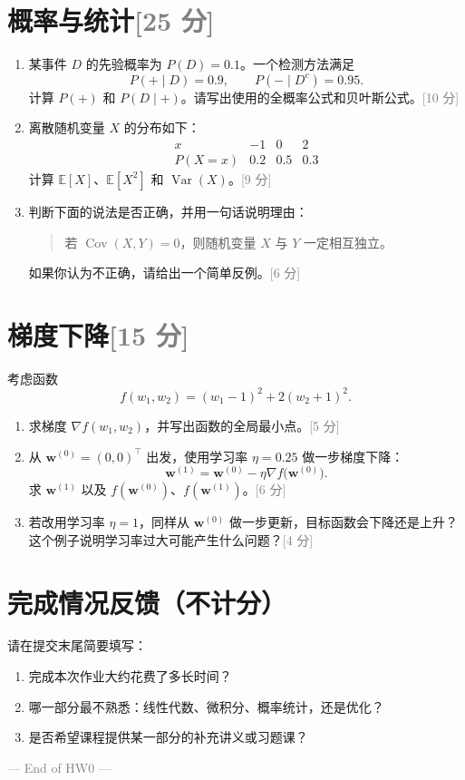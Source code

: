 \documentclass[11pt,a4paper]{article}
\newcommand{\E}{\mathbb{E}}
\newcommand{\Var}{\operatorname{Var}}
\newcommand{\Cov}{\operatorname{Cov}}
\newcommand{\grad}{\nabla}
\newcommand{\points}[1]{\hfill\textcolor{gray}{[#1 分]}}
\begin{document}
\section{概率与统计\texorpdfstring{\points{25}}{（25 分）}}

\begin{enumerate}
    \item 某事件 $D$ 的先验概率为 $P(D)=0.1$。一个检测方法满足
    \[
        P(+\mid D)=0.9,
        \qquad
        P(-\mid D^c)=0.95.
    \]
    计算 $P(+)$ 和 $P(D\mid +)$。请写出使用的全概率公式和贝叶斯公式。\points{10}

    \item 离散随机变量 $X$ 的分布如下：
    \[
    \begin{array}{c|ccc}
        x & -1 & 0 & 2\\ \hline
        P(X=x) & 0.2 & 0.5 & 0.3
    \end{array}
    \]
    计算 $\E[X]$、$\E[X^2]$ 和 $\Var(X)$。\points{9}

    \item 判断下面的说法是否正确，并用一句话说明理由：
    \begin{quote}
        若 $\Cov(X,Y)=0$，则随机变量 $X$ 与 $Y$ 一定相互独立。
    \end{quote}
    如果你认为不正确，请给出一个简单反例。\points{6}
\end{enumerate}

\section{梯度下降\texorpdfstring{\points{15}}{（15 分）}}

考虑函数
\[
    f(w_1,w_2)=(w_1-1)^2+2(w_2+1)^2.
\]

\begin{enumerate}
    \item 求梯度 $\grad f(w_1,w_2)$，并写出函数的全局最小点。\points{5}

    \item 从 $\bm w^{(0)}=(0,0)^\top$ 出发，使用学习率 $\eta=0.25$ 做一步梯度下降：
    \[
        \bm w^{(1)}=\bm w^{(0)}-\eta\grad f\bigl(\bm w^{(0)}\bigr).
    \]
    求 $\bm w^{(1)}$ 以及 $f(\bm w^{(0)})$、$f(\bm w^{(1)})$。\points{6}

    \item 若改用学习率 $\eta=1$，同样从 $\bm w^{(0)}$ 做一步更新，目标函数会下降还是上升？这个例子说明学习率过大可能产生什么问题？\points{4}
\end{enumerate}

\section*{完成情况反馈（不计分）}

请在提交末尾简要填写：
\begin{enumerate}[label=\arabic*.,leftmargin=2em]
    \item 完成本次作业大约花费了多长时间？
    \item 哪一部分最不熟悉：线性代数、微积分、概率统计，还是优化？
    \item 是否希望课程提供某一部分的补充讲义或习题课？
\end{enumerate}

\vfill
\begin{center}
    \textcolor{gray}{--- End of HW0 ---}
\end{center}
\end{document}
